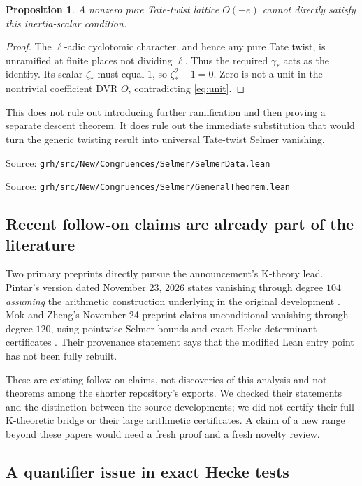 \documentclass[11pt,letterpaper]{article}
\newtheorem{proposition}[theorem]{Proposition}
\theoremstyle{definition}
\theoremstyle{remark}
\newcommand{\code}[1]{\texttt{\small\detokenize{#1}}}
\newcommand{\src}[1]{\par{\small\color{navy}Source: \nolinkurl{grh/src/#1}}\par}
\begin{document}
\begin{proposition}\label{prop:tate-obstruction}
A nonzero pure Tate-twist lattice \(O(-e)\) cannot directly satisfy
this inertia-scalar condition.
\end{proposition}
\begin{proof}
The \(\ell\)-adic cyclotomic character, and hence any pure Tate
twist, is unramified at finite places not dividing \(\ell\).
Thus the required \(\gamma_*\) acts as the identity. Its scalar
\(\zeta_*\) must equal \(1\), so \(\zeta_*^2-1=0\).
Zero is not a unit in the nontrivial coefficient DVR \(O\),
contradicting \eqref{eq:unit}.
\end{proof}

This does not rule out introducing further ramification and then
proving a separate descent theorem. It does rule out the immediate
substitution that would turn the generic twisting result into
universal Tate-twist Selmer vanishing.
\src{New/Congruences/Selmer/SelmerData.lean}
\src{New/Congruences/Selmer/GeneralTheorem.lean}

\subsection{Recent follow-on claims are already part of the literature}

Two primary preprints directly pursue the announcement's K-theory
lead. Pintar's version dated November 23, 2026 states vanishing
through degree \(104\) \emph{assuming} the arithmetic construction
underlying \code{corGK_of} in the original development
\cite{pintar}. Mok and Zheng's November 24 preprint claims
unconditional vanishing through degree \(120\), using pointwise
Selmer bounds and exact Hecke determinant certificates
\cite{mok-zheng}. Their provenance statement says that the modified
Lean entry point has not been fully rebuilt.

These are existing follow-on claims, not discoveries of this
analysis and not theorems among the shorter repository's exports.
We checked their statements and the distinction between the source
developments; we did not certify their full K-theoretic bridge or
their large arithmetic certificates. A claim of a new range beyond
these papers would need a fresh proof and a fresh novelty review.

\subsection{A quantifier issue in exact Hecke tests}
\end{document}
